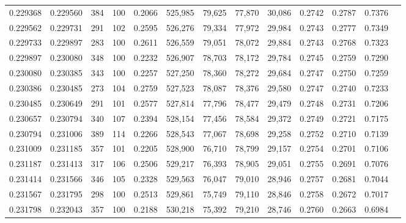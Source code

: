 \begin{tabular}{rrrrrrrrrrrrr}
0.229368 & 0.229560 &   384 & 100 &                                     0.2066 & 525,985 &  79,625 &  77,870 &  30,086 & 0.2742 & 0.2787 & 0.7376 \\
0.229562 & 0.229731 &   291 & 102 &                                     0.2595 & 526,276 &  79,334 &  77,972 &  29,984 & 0.2743 & 0.2777 & 0.7349 \\
0.229733 & 0.229897 &   283 & 100 &                                     0.2611 & 526,559 &  79,051 &  78,072 &  29,884 & 0.2743 & 0.2768 & 0.7323 \\
0.229897 & 0.230080 &   348 & 100 &                                     0.2232 & 526,907 &  78,703 &  78,172 &  29,784 & 0.2745 & 0.2759 & 0.7290 \\
0.230080 & 0.230385 &   343 & 100 &                                     0.2257 & 527,250 &  78,360 &  78,272 &  29,684 & 0.2747 & 0.2750 & 0.7259 \\
0.230386 & 0.230485 &   273 & 104 &                                     0.2759 & 527,523 &  78,087 &  78,376 &  29,580 & 0.2747 & 0.2740 & 0.7233 \\
0.230485 & 0.230649 &   291 & 101 &                                     0.2577 & 527,814 &  77,796 &  78,477 &  29,479 & 0.2748 & 0.2731 & 0.7206 \\
0.230657 & 0.230794 &   340 & 107 &                                     0.2394 & 528,154 &  77,456 &  78,584 &  29,372 & 0.2749 & 0.2721 & 0.7175 \\
0.230794 & 0.231006 &   389 & 114 &                                     0.2266 & 528,543 &  77,067 &  78,698 &  29,258 & 0.2752 & 0.2710 & 0.7139 \\
0.231009 & 0.231185 &   357 & 101 &                                     0.2205 & 528,900 &  76,710 &  78,799 &  29,157 & 0.2754 & 0.2701 & 0.7106 \\
0.231187 & 0.231413 &   317 & 106 &                                     0.2506 & 529,217 &  76,393 &  78,905 &  29,051 & 0.2755 & 0.2691 & 0.7076 \\
0.231414 & 0.231566 &   346 & 105 &                                     0.2328 & 529,563 &  76,047 &  79,010 &  28,946 & 0.2757 & 0.2681 & 0.7044 \\
0.231567 & 0.231795 &   298 & 100 &                                     0.2513 & 529,861 &  75,749 &  79,110 &  28,846 & 0.2758 & 0.2672 & 0.7017 \\
0.231798 & 0.232043 &   357 & 100 &                                     0.2188 & 530,218 &  75,392 &  79,210 &  28,746 & 0.2760 & 0.2663 & 0.6984 \\

\end{tabular}
